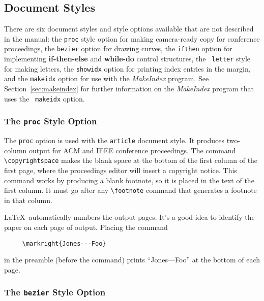 \subsection{Document Styles}
 
There are six document styles and style options available that
are not described in the manual: the \mbox{\tt proc} style option for
making camera-ready copy for conference proceedings, the {\tt bezier}
option for drawing curves, the {\tt ifthen} option for implementing
{\bf if-then-else} and {\bf while-do} control structures, the \mbox{\tt
letter} style for making letters, the {\tt showidx} option for
printing index entries in the margin, and the {\tt makeidx} option for use
with the {\it MakeIndex\/} program.
See Section~\ref{sec:makeindex} for further
information on the {\em MakeIndex\/} program that uses the {\tt
makeidx} option.
 
\subsubsection{The {\tt proc} Style Option}
 
The {\tt proc} option is used with the \mbox{\tt article} document
style.  It produces two-column output for ACM and IEEE conference
proceedings.  The command \hbox{\verb|\copyrightspace|} makes the blank
space at the bottom of the first column of the first page, where the
proceedings editor will insert a copyright notice.  This command works
by producing a blank footnote, so it is placed in the text of the first
column.  It must go after any \hbox{\verb|\footnote|} command that
generates a footnote in that column.
 
\LaTeX\ automatically numbers the output pages.  It's a good idea 
to identify the paper on each page of output.  Placing the command
\begin{verbatim}
     \markright{Jones---Foo}
\end{verbatim}
in the preamble (before the \hbox{\verb||} command)
prints ``Jones---Foo'' at the bottom of each page.  
 
\subsubsection{The {\tt bezier} Style Option}
 
